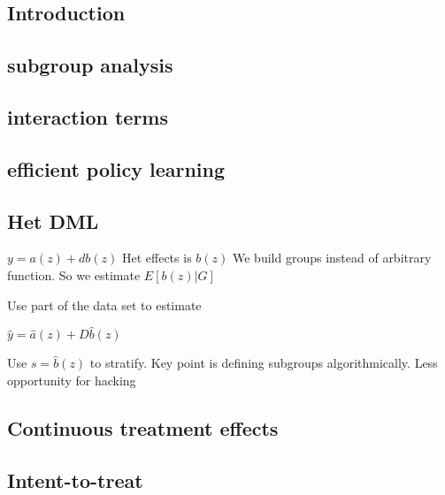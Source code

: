 
\subsection{Introduction}


\subsection{subgroup analysis}

\subsection{interaction terms}

\subsection{efficient policy learning}

\subsection{Het DML}
\(y=a(z)+d b(z)\)
Het effects is \(b(z)\)
We build groups instead of arbitrary function. So we estimate \(E[b(z)|G]\)

Use part of the data set to estimate

\(\hat y =\hat a (z)+D\hat b(z)\)

Use \(s=\hat b(z)\) to stratify. Key point is defining subgroups algorithmically. Less opportunity for hacking

\subsection{Continuous treatment effects}

\subsection{Intent-to-treat}

